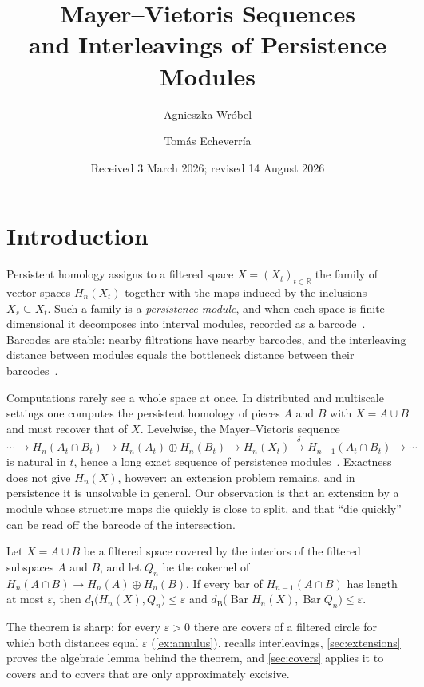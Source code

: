 \documentclass[11pt, twoside]{article}
\title{Mayer--Vietoris Sequences\\and Interleavings of Persistence Modules}
\author{Agnieszka Wróbel \and Tomás Echeverría}
\date{Received 3 March 2026; revised 14 August 2026}
\newcommand{\R}{\mathbb{R}}
\DeclareMathOperator{\Barc}{Bar}
\newcommand{\dI}{d_{\mathrm{I}}}
\newcommand{\dB}{d_{\mathrm{B}}}
\begin{document}
\maketitle

\section{Introduction}
\label{sec:intro}

Persistent homology assigns to a filtered space $X = (X_t)_{t\in\R}$ the
family of vector spaces $H_n(X_t)$ together with the maps induced by the
inclusions $X_s \subseteq X_t$. Such a family is a \emph{persistence module},
and when each space is finite-dimensional it decomposes into interval modules,
recorded as a barcode~\cite{crawley-boevey2015,zomorodian2005}. Barcodes are
stable: nearby filtrations have nearby barcodes, and the interleaving distance
between modules equals the bottleneck distance between their
barcodes~\cite{chazal2009,lesnick2015,bauer2015}.

Computations rarely see a whole space at once. In distributed and multiscale
settings one computes the persistent homology of pieces $A$ and $B$ with
$X = A \cup B$ and must recover that of $X$. Levelwise, the Mayer--Vietoris
sequence
\begin{equation}
\label{eq:mv-level}
\cdots \to H_n(A_t\cap B_t) \to H_n(A_t)\oplus H_n(B_t) \to H_n(X_t)
  \xrightarrow{\ \delta\ } H_{n-1}(A_t\cap B_t) \to \cdots
\end{equation}
is natural in $t$, hence a long exact sequence of persistence
modules~\cite{dicuroya2023}. Exactness does not give $H_n(X)$, however: an
extension problem remains, and in persistence it is unsolvable in general.
Our observation is that an extension by a module whose structure maps die
quickly is close to split, and that ``die quickly'' can be read off the
barcode of the intersection.

\begin{maintheorem}
\label{thm:A}
Let $X = A\cup B$ be a filtered space covered by the interiors of the
filtered subspaces $A$ and $B$, and let $Q_n$ be the cokernel of
$H_n(A\cap B) \to H_n(A)\oplus H_n(B)$. If every bar of $H_{n-1}(A\cap B)$ has
length at most $\varepsilon$, then $\dI\bigl(H_n(X), Q_n\bigr) \le \varepsilon$
and $\dB\bigl(\Barc H_n(X), \Barc Q_n\bigr) \le \varepsilon$.
\end{maintheorem}

The theorem is sharp: for every $\varepsilon > 0$ there are covers of a
filtered circle for which both distances equal $\varepsilon$
(\cref{ex:annulus}).  recalls interleavings,
\cref{sec:extensions} proves the algebraic lemma behind the theorem, and
\cref{sec:covers} applies it to covers and to covers that are only
approximately excisive.
\end{document}
